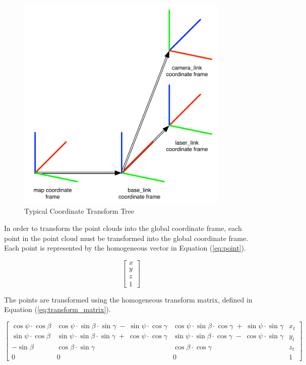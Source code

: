 \documentclass[12pt]{report}
\begin{document}
\begin{figure}[ht]
  \centering
  \includegraphics[width=4in,keepaspectratio]{transforms.pdf}
  \caption{Typical Coordinate Transform Tree}
  \label{fig:transforms}
\end{figure}

In order to transform the point clouds into the global coordinate frame, each point in the point cloud must be transformed into the global coordinate frame.  Each point is represented by the homogeneous vector in Equation (\ref{eq:point}).

\begin{equation} \label{eq:point}
\left[ \begin{array}{c} x \\ y \\ z \\ 1 \end{array} \right]
\end{equation}

The points are transformed using the homogeneous transform matrix\cite{lavalle2006planning}, defined in Equation (\ref{eq:transform_matrix}).

\begin{equation} \label{eq:transform_matrix}
\left[ \begin{array}{cccc} \cos \psi \cdot \cos \beta  & \cos \psi \cdot \sin \beta \cdot \sin \gamma \; -\; \sin \psi \cdot \cos \gamma  & \cos \psi \cdot \sin \beta \cdot \cos \gamma \; +\; \sin \psi \cdot \sin \gamma  & x_{t} \\ \sin \psi \cdot \cos \beta  & \sin \psi \cdot \sin \beta \cdot \sin \gamma \; +\; \cos \psi \cdot \cos \gamma  & \sin \psi \cdot \sin \beta \cdot \cos \gamma \; -\; \cos \psi \cdot \sin \gamma  & y_{t} \\ -\sin \beta  & \cos \beta \cdot \sin \gamma  & \cos \beta \cdot \cos \gamma & z_{t} \\ 0 & 0 & 0 & 1 \end{array} \right]
\end{equation}
\end{document}
